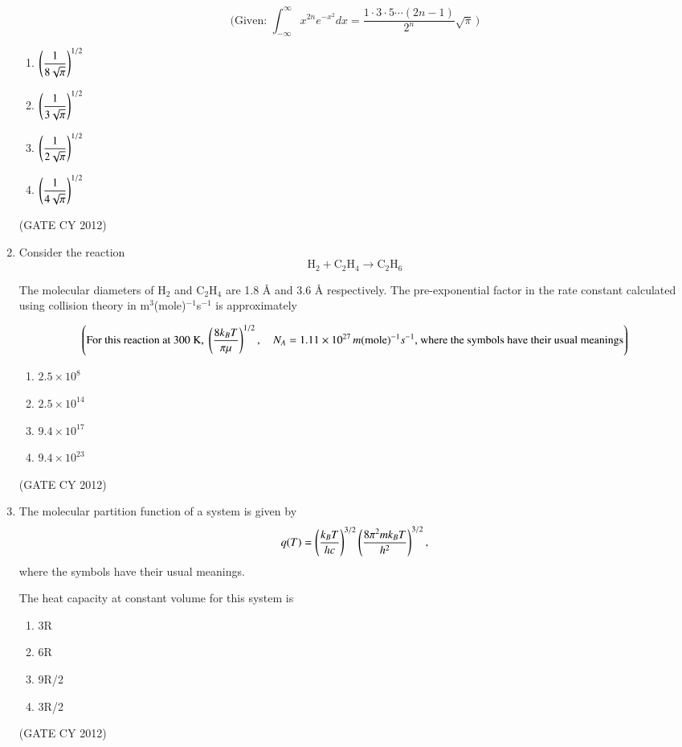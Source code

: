 \documentclass[12pt]{article}
\begin{document}
\begin{enumerate}
\[
\text{(Given: } \int_{-\infty}^{\infty} x^{2n} e^{-x^2} dx = \frac{1 \cdot 3 \cdot 5 \cdots (2n-1)}{2^n} \sqrt{\pi} \,)
\]

\begin{enumerate}
    \item $\left(\dfrac{1}{8\sqrt{\pi}}\right)^{1/2}$
    \item $\left(\dfrac{1}{3\sqrt{\pi}}\right)^{1/2}$
    \item $\left(\dfrac{1}{2\sqrt{\pi}}\right)^{1/2}$
    \item $\left(\dfrac{1}{4\sqrt{\pi}}\right)^{1/2}$
\end{enumerate}
\hfill (GATE CY 2012)


\item Consider the reaction 
\[
\text{H}_2 + \text{C}_2\text{H}_4 \to \text{C}_2\text{H}_6
\]

The molecular diameters of H$_2$ and C$_2$H$_4$ are 1.8 \AA{} and 3.6 \AA{} respectively.  
The pre-exponential factor in the rate constant calculated using collision theory in m$^3$(mole)$^{-1}$s$^{-1}$ is approximately

\[
\left( \text{For this reaction at 300 K, } \left(\frac{8k_B T}{\pi \mu}\right)^{1/2}, \quad N_A = 1.11 \times 10^{27}\, m(\text{mole})^{-1} s^{-1} \text{, where the symbols have their usual meanings} \right)
\]

\begin{multicols}{2}
\begin{enumerate}
    \item $2.5 \times 10^8$
    \item $2.5 \times 10^{14}$
    \item $9.4 \times 10^{17}$
    \item $9.4 \times 10^{23}$
\end{enumerate}
\end{multicols}
\hfill (GATE CY 2012)


\item The molecular partition function of a system is given by
\[
q(T) = \left(\frac{k_B T}{hc}\right)^{3/2} \left(\frac{8 \pi^2 m k_B T}{h^2}\right)^{3/2},
\]
where the symbols have their usual meanings.  

The heat capacity at constant volume for this system is

\begin{multicols}{2}
\begin{enumerate}
    \item 3R
    \item 6R
    \item 9R/2
    \item 3R/2
\end{enumerate}
\end{multicols}
\hfill (GATE CY 2012)


\end{enumerate}
\end{document}
